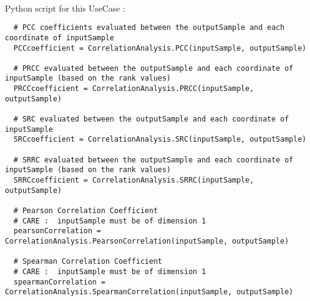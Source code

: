 \textspace\\
Python script for this UseCase :

\begin{lstlisting}
  # PCC coefficients evaluated between the outputSample and each coordinate of inputSample
  PCCcoefficient = CorrelationAnalysis.PCC(inputSample, outputSample)

  # PRCC evaluated between the outputSample and each coordinate of inputSample (based on the rank values)
  PRCCcoefficient = CorrelationAnalysis.PRCC(inputSample, outputSample)

  # SRC evaluated between the outputSample and each coordinate of inputSample
  SRCcoefficient = CorrelationAnalysis.SRC(inputSample, outputSample)

  # SRRC evaluated between the outputSample and each coordinate of inputSample (based on the rank values)
  SRRCcoefficient = CorrelationAnalysis.SRRC(inputSample, outputSample)

  # Pearson Correlation Coefficient
  # CARE :  inputSample must be of dimension 1
  pearsonCorrelation = CorrelationAnalysis.PearsonCorrelation(inputSample, outputSample)

  # Spearman Correlation Coefficient
  # CARE :  inputSample must be of dimension 1
  spearmanCorrelation = CorrelationAnalysis.SpearmanCorrelation(inputSample, outputSample)
\end{lstlisting}

